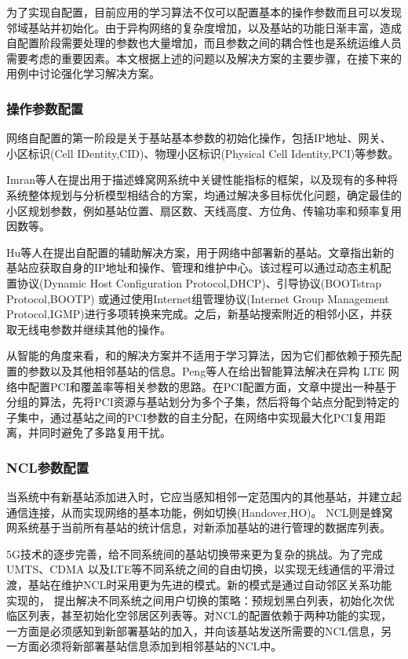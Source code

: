 ﻿\documentclass[11pt,draftclsnofoot,onecolumn,journal,letterpaper]{IEEEtran}
\begin{document}
为了实现自配置，目前应用的学习算法不仅可以配置基本的操作参数而且可以发现邻域基站并初始化。由于异构网络的复杂度增加，以及基站的功能日渐丰富，造成自配置阶段需要处理的参数也大量增加，而且参数之间的耦合性也是系统运维人员需要考虑的重要因素。本文根据上述的问题以及解决方案的主要步骤，在接下来的用例中讨论强化学习解决方案。


\subsubsection{操作参数配置}

网络自配置的第一阶段是关于基站基本参数的初始化操作，包括IP地址、网关、小区标识(Cell IDentity,CID)、物理小区标识(Physical Cell Identity,PCI)等参数。

Imran等人在\cite{Imran2013a}提出用于描述蜂窝网系统中关键性能指标的框架，以及现有的多种将系统整体规划与分析模型相结合的方案，均通过解决多目标优化问题，确定最佳的小区规划参数，例如基站位置、扇区数、天线高度、方位角、传输功率和频率复用因数等。

Hu等人在\cite{Hu2010}提出自配置的辅助解决方案，用于网络中部署新的基站。文章指出新的基站应获取自身的IP地址和操作、管理和维护中心。该过程可以通过动态主机配置协议(Dynamic Host Configuration Protocol,DHCP)、引导协议(BOOTstrap Protocol,BOOTP) 或通过使用Internet组管理协议(Internet Group Management Protocol,IGMP)进行多项转换来完成。之后，新基站搜索附近的相邻小区，并获取无线电参数并继续其他的操作。

从智能的角度来看，\cite{Wainio2016}和\cite{Hu2010}的解决方案并不适用于学习算法，因为它们都依赖于预先配置的参数以及其他相邻基站的信息。Peng等人在\cite{Peng2013}给出智能算法解决在异构 LTE 网络中配置PCI和覆盖率等相关参数的思路。在PCI配置方面，文章中提出一种基于分组的算法，先将PCI资源与基站划分为多个子集，然后将每个站点分配到特定的子集中，通过基站之间的PCI参数的自主分配，在网络中实现最大化PCI复用距离，并同时避免了多路复用干扰。

\subsubsection{NCL参数配置}

当系统中有新基站添加进入时，它应当感知相邻一定范围内的其他基站，并建立起通信连接，从而实现网络的基本功能，例如切换(Handover,HO)。 NCL则是蜂窝网系统基于当前所有基站的统计信息，对新添加基站的进行管理的数据库列表。

5G技术的逐步完善，给不同系统间的基站切换带来更为复杂的挑战。为了完成UMTS、CDMA 以及LTE等不同系统之间的自由切换，以实现无线通信的平滑过渡，基站在维护NCL时采用更为先进的模式。新的模式是通过自动邻区关系功能实现的，\cite{3gpp.32.511} 提出解决不同系统之间用户切换的策略：预规划黑白列表，初始化次优临区列表，甚至初始化空邻居区列表等。对NCL的配置依赖于两种功能的实现，一方面是必须感知到新部署基站的加入，并向该基站发送所需要的NCL信息，另一方面必须将新部署基站信息添加到相邻基站的NCL中。
\end{document}
